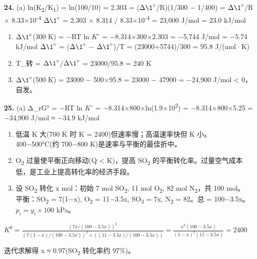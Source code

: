 \documentclass[a4paper,11pt]{ctexart}
\begin{document}
\textbf{24.}
(a) ln(K\textsubscript{2}/K\textsubscript{1}) = ln(100/10) = 2.303 = (\(\Delta \1^{\circ}\)/R)(1/300 − 1/400) = \(\Delta \1^{\circ}\)/R × 8.33×10\textsuperscript{-4}
\(\Delta \1^{\circ}\) = 2.303 × 8.314 / 8.33×10\textsuperscript{-4} = 23,000 J/mol = 23.0 kJ/mol

\begin{enumerate}
\def\labelenumi{(\alph{enumi})}
\setcounter{enumi}{1}
\item
  \(\Delta \1^{\circ}\)(300 K) = −RT ln \(K^{\circ}\) = −8.314×300×2.303 = −5,744 J/mol = −5.74 kJ/mol
  \(\Delta \1^{\circ}\) = (\(\Delta \1^{\circ}\) − \(\Delta \1^{\circ}\))/T = (23000+5744)/300 = 95.8 J/(mol·K)
\item
  T\_转 = \(\Delta \1^{\circ}\)/\(\Delta \1^{\circ}\) = 23000/95.8 = 240 K
\item
  \(\Delta \1^{\circ}\)(500 K) = 23000 − 500×95.8 = 23000 − 47900 = −24,900 J/mol \textless{} 0，自发。
\end{enumerate}

\textbf{25.}
(a) Δ\_rG° = −RT ln \(K^{\circ}\) = −8.314×800×ln(1.9×10\textsuperscript{2}) = −8.314×800×5.25 = −34,900 J/mol ≈ −34.9 kJ/mol

\begin{enumerate}
\def\labelenumi{(\alph{enumi})}
\setcounter{enumi}{1}
\item
  低温 K 大(700 K 时 K = 2400)但速率慢；高温速率快但 K 小。400−500°C(约 700−800 K)是速率与平衡的最佳折中。
\item
  O\textsubscript{2} 过量使平衡正向移动(Q \textless{} K)，提高 SO\textsubscript{2} 的平衡转化率。过量空气成本低，是工业上提高转化率的经济手段。
\item
  设 SO\textsubscript{2} 转化 x mol：初始 7 mol SO\textsubscript{2}, 11 mol O\textsubscript{2}, 82 mol N\textsubscript{2}，共 100 mol。
  平衡：SO\textsubscript{2} = 7(1−x), O\textsubscript{2} = 11−3.5x, SO\textsubscript{3} = 7x, N\textsubscript{2} = 82。总 = 100−3.5x。
  \(p_i = y_i \times 100\) kPa。
\end{enumerate}

\(K^\theta = \frac{(7x/(100-3.5x))^2}{(7(1-x)/(100-3.5x))^2 \times ((11-3.5x)/(100-3.5x))} = \frac{x^2(100-3.5x)}{(1-x)^2(11-3.5x)} = 2400\)

迭代求解得 x ≈ 0.97(SO\textsubscript{2} 转化率约 97\%)。
\end{document}
